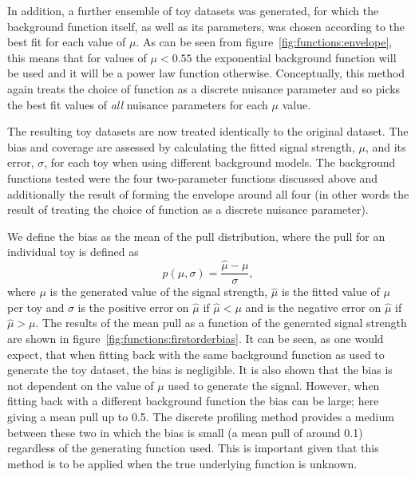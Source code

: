 In addition, a further ensemble of toy datasets was generated, for which the background function itself, as well 
as its parameters, was chosen according to the best fit for each value of $\mu$. As can be seen from 
figure~\ref{fig:functions:envelope}, this means that for values of $\mu < 0.55$ the exponential background 
function will be used and it will be a power law function otherwise.
Conceptually, this method again
treats the choice of function as a discrete nuisance parameter and so picks the
best fit values of {\em all\/} nuisance parameters for each $\mu$ value.

The resulting toy datasets are now treated identically to the original dataset. The bias and coverage are assessed by calculating the fitted signal strength, $\mu$, and its error, $\sigma$, for each toy when using different background models. The background functions tested were the four two-parameter functions discussed above and additionally the result of forming the envelope around all four (in other words the result of treating the choice of function as a discrete nuisance parameter). 

We define the bias as the mean of the pull distribution, where the pull for an individual toy is defined as
\begin{equation}
	p(\mu,\sigma) = \frac{\hat{\mu}-\mu}{\sigma},
\end{equation}
where $\mu$ is the generated value of the signal strength, $\hat{\mu}$ is the fitted value of $\mu$ per toy and $\sigma$ is the positive error on $\hat{\mu}$ if $\hat{\mu} < \mu$ and is the negative error on $\hat{\mu}$ if $\hat{\mu} > \mu$. The results of the mean pull as a function of the generated signal strength are shown in figure~\ref{fig:functions:firstorderbias}. It can be seen, as one would expect, that when fitting back with the same background function as used to generate the toy dataset, the bias is negligible. It is also shown that the bias is not dependent on the value of $\mu$ used to generate the signal. However, when fitting back with a different background function the bias can be large; here giving a mean pull up to 0.5.
The discrete profiling method provides a medium between these two in which the bias is small (a mean pull of around 0.1) regardless of the generating function used. This is important given that this method is to be applied when the true underlying function is unknown.

